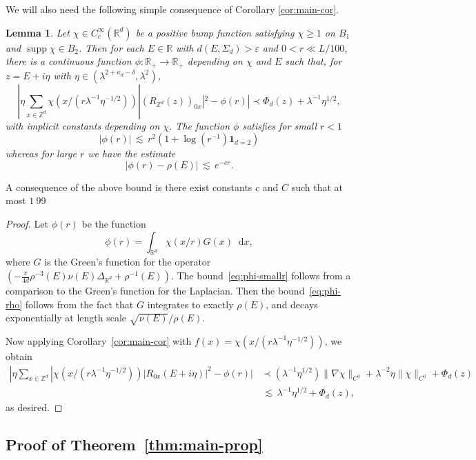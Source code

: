 \documentclass[11pt]{amsart}
\def\Real{{\mathbb R}}
\def\R{{\mathbb{R}}}
\def\bbZ{{\mathbb Z}}
\def\eps{{\varepsilon}}
\def\One{{\mathbf{1}}}
\newcommand{\diff}{\mathop{}\!\mathrm{d}}
\newcommand{\supp}{\operatorname*{supp}}
\def\lsim{{\,\lesssim\,}}
\newcommand{\ldom}{\prec}
\numberwithin{equation}{section}
\numberwithin{theorem}{section}
\newtheorem{lemma}[theorem]{Lemma}
\begin{document}
We will also need the following simple consequence of Corollary \ref{cor:main-cor}.
\begin{lemma}
\label{lem:radial-cutoff}
Let $\chi\in C_c^\infty(\Real^d)$ be a positive bump function satisfying $\chi \geq 1$ on $B_1$
and $\supp \chi \in B_2$.  Then for each $E\in \R$ with $d(E,\Sigma_d)>\eps$ and $0<r\ll L/100$, there is a continuous function $\phi:\Real_+\to\Real_+$ depending on $\chi$ and $E$ such that, for $z=E+i\eta$ with
$\eta\in (\lambda^{2+\kappa_d-\delta},\lambda^2)$,
\[
|\eta \sum_{x\in\bbZ^d} \chi(x / (r\lambda^{-1}\eta^{-1/2})) |(R_{\bbZ^d}(z))_{0x}|^2 - \phi(r)|
\ldom \Phi_d(z) + \lambda^{-1}\eta^{1/2},
\]
with implicit constants depending on $\chi$.
The function $\phi$ satisfies for small $r<1$
\begin{equation}
\label{eq:phi-smallr}
|\phi(r)| \lsim r^2
(1 + \log(r^{-1})\One_{d=2})
\end{equation}
whereas for large $r$ we have the estimate
\begin{equation}
\label{eq:phi-rho}
|\phi(r) - \rho(E)| \lsim e^{-cr}.
\end{equation}
\end{lemma}
 A consequence of the above bound is there exist constants $c$ and $C$  such that at most
 $1\
$99\

\begin{proof}
Let $\phi(r)$ be the function
\[
\phi(r) = \int_{\Real^d} \chi(x/r) G(x) \diff x,
\]
where $G$ is the Green's function for the operator
$(-\frac{\pi}{4d}\rho^{-3}(E)\nu(E) \Delta_{\Real^d} + \rho^{-1}(E))$.  The bound~\eqref{eq:phi-smallr} follows from a comparison to the Green's function for the Laplacian. Then the bound~\eqref{eq:phi-rho} follows from the fact that $G$ integrates to exactly
$\rho(E)$, and decays exponentially at length scale $\sqrt{\nu(E)}/\rho(E)$.

Now applying
Corollary~\ref{cor:main-cor} with $f(x) = \chi(x/(r \lambda^{-1}\eta^{-1/2}))$, we obtain
\begin{align*}
|\eta \sum_{x\in \bbZ^d} |\chi(x/(r\lambda^{-1}\eta^{-1/2}))
|R_{0x}(E+i\eta)|^2 - \phi(r)|
&\ldom (\lambda^{-1} \eta^{1/2}) \|\nabla \chi\|_{C^0} +
\lambda^{-2}\eta \|\chi\|_{C^0}
+ \Phi_d(z)\\
&\lsim \lambda^{-1} \eta^{1/2}+\Phi_d(z),
\end{align*}
as desired.
\end{proof}

\subsection{Proof of Theorem~\ref{thm:main-prop}}
\end{document}
